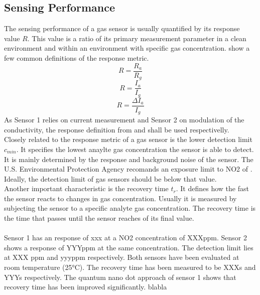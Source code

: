 {\subsection{Sensing Performance}
The sensing performance of a gas sensor is usually quantified by its response value $R$. This value is a ratio of its primary measurement parameter in a clean environment and within an environment with specific gas concentration.  show a few common definitions of the response metric.
\begin{equation}
\label{eqn:respone_1}
    R = \frac{R_a}{R_g}
\end{equation}
\begin{equation}
\label{eqn:respone_2}
    R = \frac{I_a}{I_g}
\end{equation}
\begin{equation}
\label{eqn:respone_3}
    R = \frac{\Delta I_a}{I_g}
\end{equation}
As Sensor 1 relies on current measurement and Sensor 2 on modulation of the conductivity, the response definition from  and  shall be used respectivelly. \\ 
Closely related to the response metric of a gas sensor is the lower detection limit $c_{min}$. It specifies the lowest anaylte gas concentration the sensor is able to detect. It is mainly determined by the response and background noise of the sensor. The U.S. Environmental Protection Agency recomands an exposure limit to NO2 of . Ideally, the detection limit of gas sensors should be below that value. \\
Another important characteristic is the recovery time $t_r$. It defines how the fast the sensor reacts to changes in gas concentration. Usually it is measured by subjecting the sensor to a specific analyte gas concentration. The recovery time is the time that passes until the sensor reaches  of its final value. \\
\\
Sensor 1 has an response of xxx at a NO2 concentration of XXXppm. Sensor 2 shows a response of YYYppm at the same concentration. The detection limit lies at XXX ppm and yyyppm respectively. Both sensors have been evaluated at room temperature (25°C). The recovery time has been measured to be XXXs and YYYs respectively. 
The quantum nano dot approach of sensor 1 shows that recovery time has been improved significantly. blabla

}
